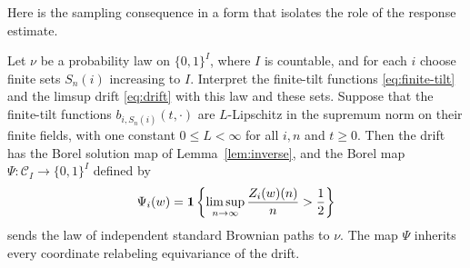 Here is the sampling consequence in a form that isolates the role of
the response estimate.

\begin{proposition}
\label{prop:brownian-sampler}
Let $\nu$ be a probability law on $\{0,1\}^I$, where $I$ is countable,
and for each $i$ choose finite sets $S_n(i)$ increasing to $I$.
Interpret the finite-tilt functions \eqref{eq:finite-tilt} and the
limsup drift \eqref{eq:drift} with this law and these sets.
Suppose that the finite-tilt functions $b_{i,S_n(i)}(t,\cdot)$ are
$L$-Lipschitz in the supremum norm on their finite fields, with one
constant $0\le L<\infty$ for all $i,n$ and $t\ge0$.
Then the drift has the Borel solution map of Lemma~\ref{lem:inverse},
and the Borel map $\Psi:\mathcal C_I\longrightarrow\{0,1\}^I$
defined by
\begin{equation}\label{eq:readout}
 \Psi_i(w)=
 \mathbf 1\left\{\limsup_{n\to\infty}\frac{Z_i(w)(n)}{n}>\frac12\right\}
\end{equation}
sends the law of independent standard Brownian paths to $\nu$.
The map $\Psi$ inherits every coordinate relabeling equivariance of
the drift.
\end{proposition}

